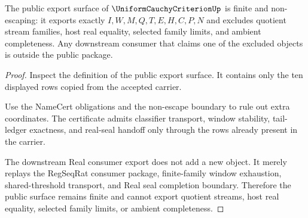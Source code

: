\begin{theorem}
\label{thm:uniform-cauchy-criterion-public-non-escape-export}
The public export surface of $\UniformCauchyCriterionUp$ is finite and non-escaping: it exports exactly $I,W,M,Q,T,E,H,C,P,N$ and excludes quotient stream families, host real equality, selected family limits, and ambient completeness. Any downstream consumer that claims one of the excluded objects is outside the public package.
\end{theorem}
\begin{proof}
Inspect the definition of the public export surface. It contains only the ten displayed rows copied from the accepted carrier.

Use the NameCert obligations and the non-escape boundary to rule out extra coordinates. The certificate admits classifier transport, window stability, tail-ledger exactness, and real-seal handoff only through the rows already present in the carrier.

The downstream Real consumer export does not add a new object. It merely replays the RegSeqRat consumer package, finite-family window exhaustion, shared-threshold transport, and Real seal completion boundary. Therefore the public surface remains finite and cannot export quotient streams, host real equality, selected family limits, or ambient completeness.
\end{proof}

